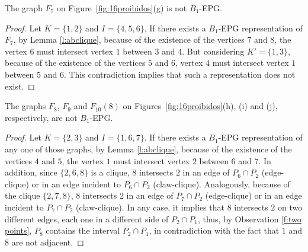 \documentclass{dmgt}
\begin{document}
\begin{lemma}\label{lem:F_7}
The graph $F_7$ on Figure~\ref{fig:16proibidos}(g) is not   $B_1$-EPG.
\end{lemma}
\begin{proof} Let $K=\{1,2\}$ and $I=\{4,5,6\}$. If there exists a $B_1$-EPG representation of $F_7$,  by Lemma \ref{l:abclique},  because of the existence of the vertices  $7$ and $8$, the vertex $6$ must intersect  vertex $1$ between $3$ and $4$. But considering $K'=\{1,3\}$, because of the existence of the vertices $5$ and $6$,  vertex $4$ must intersect vertex $1$ between $5$ and $6$. This contradiction implies that such a representation does not exist.
 \end{proof} 
 
 \begin{lemma}\label{lem:F_8_9_10(8)}
The graphs $F_8$, $F_9$ and $F_{10}(8)$ on Figures~\ref{fig:16proibidos}(h), (i) and (j), respectively, are not   $B_1$-EPG.
\end{lemma}
\begin{proof} Let $K=\{2,3\}$ and $I=\{1,6,7\}$. If there exists a $B_1$-EPG representation of any one of those graphs,  by Lemma \ref{l:abclique},  because of the existence of the vertices  $4$ and $5$, the vertex $1$ must intersect  vertex $2$ between $6$ and $7$. In addition, since $\{2,6,8\}$ is a clique, $8$ intersects $2$ in an edge of $P_6\cap P_2$ (edge-clique) or in an edge incident to $P_6\cap P_2$ (claw-clique). Analogously, because of the clique $\{2,7,8\}$,  $8$ intersects $2$ in an edge of $P_7\cap P_2$ (edge-clique) or in an edge incident to $P_7\cap P_2$ (claw-clique). In any case, it implies that $8$ intersects $2$ on two different edges, each one in a different side of $P_2 \cap P_1$, thus, by Observation \ref{f:two points}, $P_8$ contains the interval  $P_2 \cap P_1$, in contradiction with the fact that $1$ and $8$ are not adjacent.
 \end{proof} 
  
\end{document}
